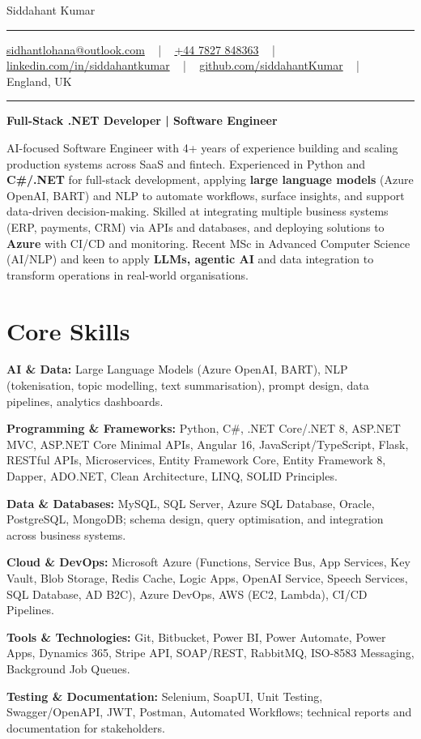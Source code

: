 \documentclass[letterpaper,10pt]{article}
\newcommand{\documentTitle}[2]{
  \begin{center}
    \vspace*{-0.3in}
    {\Huge\color{accentTitle} #1}
    \vspace{8pt}
    {\color{accentLine} \hrule}
    \vspace{2pt}
    \footnotesize{#2}
    \vspace{2pt}
    {\color{accentLine} \hrule}
  \end{center}
}
\newenvironment{resume_list}{
  \vspace{-7pt}
  \begin{itemize}[itemsep=-2px, parsep=1pt, leftmargin=30pt]
}{
  \end{itemize}
}
\begin{document}
\documentTitle{Siddahant Kumar}{
\vspace{0.1cm}
\href{mailto:sidhantlohana@outlook.com}{sidhantlohana@outlook.com} ~ | ~
\href{tel:+447827848363}{+44 7827 848363} ~ | ~
\href{https://www.linkedin.com/in/siddahantkumar/}{linkedin.com/in/siddahantkumar} ~ | ~
\href{https://github.com/siddahantKumar}{github.com/siddahantKumar} ~ | ~
England, UK
}

\begin{center}
\textbf{Full-Stack .NET Developer | Software Engineer}
\end{center}

AI-focused Software Engineer with 4+ years of experience building and scaling production systems across SaaS and fintech. Experienced in Python and \textbf{C\#/.NET} for full-stack development, applying \textbf{large language models} (Azure OpenAI, BART) and NLP to automate workflows, surface insights, and support data-driven decision-making. Skilled at integrating multiple business systems (ERP, payments, CRM) via APIs and databases, and deploying solutions to \textbf{Azure} with CI/CD and monitoring. Recent MSc in Advanced Computer Science (AI/NLP) and keen to apply \textbf{LLMs, agentic AI} and data integration to transform operations in real-world organisations.


\section{Core Skills}

\begin{resume_list}
    \item \textbf{AI \& Data:} Large Language Models (Azure OpenAI, BART), NLP (tokenisation, topic modelling, text summarisation), prompt design, data pipelines, analytics dashboards.
    \item \textbf{Programming \& Frameworks:} Python, C\#, .NET Core/.NET 8, ASP.NET MVC, ASP.NET Core Minimal APIs, Angular 16, JavaScript/TypeScript, Flask, RESTful APIs, Microservices, Entity Framework Core, Entity Framework 8, Dapper, ADO.NET, Clean Architecture, LINQ, SOLID Principles.
    \item \textbf{Data \& Databases:} MySQL, SQL Server, Azure SQL Database, Oracle, PostgreSQL, MongoDB; schema design, query optimisation, and integration across business systems.
    \item \textbf{Cloud \& DevOps:} Microsoft Azure (Functions, Service Bus, App Services, Key Vault, Blob Storage, Redis Cache, Logic Apps, OpenAI Service, Speech Services, SQL Database, AD B2C), Azure DevOps, AWS (EC2, Lambda), CI/CD Pipelines.
    \item \textbf{Tools \& Technologies:} Git, Bitbucket, Power BI, Power Automate, Power Apps, Dynamics 365, Stripe API, SOAP/REST, RabbitMQ, ISO-8583 Messaging, Background Job Queues.
    \item \textbf{Testing \& Documentation:} Selenium, SoapUI, Unit Testing, Swagger/OpenAPI, JWT, Postman, Automated Workflows; technical reports and documentation for stakeholders.
\end{resume_list}
\end{document}
